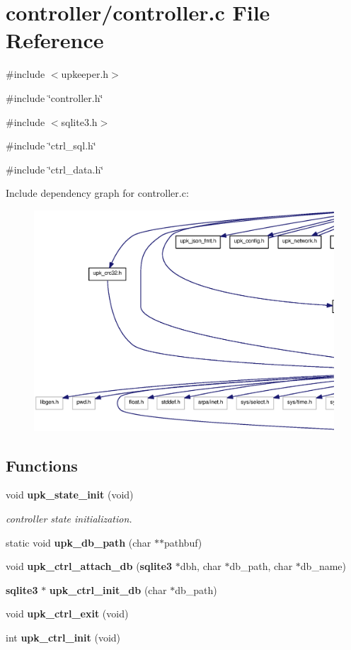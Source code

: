 \section{controller/controller.c File Reference}
\label{controller_2controller_8c}
{\ttfamily \#include $<$upkeeper.h$>$}\par
{\ttfamily \#include \char`\"{}controller.h\char`\"{}}\par
{\ttfamily \#include $<$sqlite3.h$>$}\par
{\ttfamily \#include \char`\"{}ctrl\_\-sql.h\char`\"{}}\par
{\ttfamily \#include \char`\"{}ctrl\_\-data.h\char`\"{}}\par
Include dependency graph for controller.c:
\nopagebreak
\begin{figure}[H]
\begin{center}
\leavevmode
\includegraphics[width=400pt]{controller_2controller_8c__incl}
\end{center}
\end{figure}
\subsection*{Functions}
\begin{DoxyCompactItemize}
\item 
void {\bf upk\_\-state\_\-init} (void)
\begin{DoxyCompactList}\small\item\em controller state initialization. \end{DoxyCompactList}\item 
static void {\bf upk\_\-db\_\-path} (char $\ast$$\ast$pathbuf)
\item 
void {\bf upk\_\-ctrl\_\-attach\_\-db} ({\bf sqlite3} $\ast$dbh, char $\ast$db\_\-path, char $\ast$db\_\-name)
\item 
{\bf sqlite3} $\ast$ {\bf upk\_\-ctrl\_\-init\_\-db} (char $\ast$db\_\-path)
\item 
void {\bf upk\_\-ctrl\_\-exit} (void)
\item 
int {\bf upk\_\-ctrl\_\-init} (void)
\end{DoxyCompactItemize}
